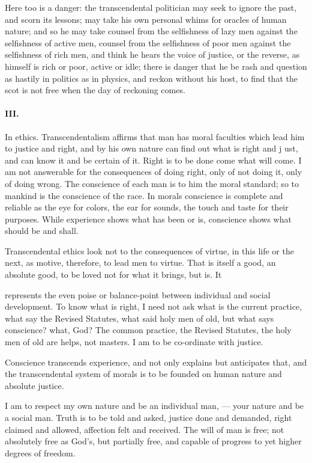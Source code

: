 \documentclass[12pt]{article}
\begin{document}
Here too is a danger: the transcendental politician 
may seek to ignore the past, and scorn its lessons; may 
take his own personal whims for oracles of human nature; and so he may take counsel from the selfishness 
of lazy men against the selfishness of active men, counsel from the selfishness of poor men against the selfishness of rich men, and think he hears the voice of justice, or the reverse, as himself is rich or poor, active or 
idle; there is danger that he be rash and question as 
hastily in politics as in physics, and reckon without his 
host, to find that the scot is not free when the day of 
reckoning comes. 

\paragraph{III.} In ethics. Transcendentalism affirms that man 
has moral faculties which lead him to justice and right, 
and by his own nature can find out what is right and 
j ust, and can know it and be certain of it. Right is to 
be done come what will come. I am not answerable for 
the consequences of doing right, only of not doing it, 
only of doing wrong. The conscience of each man is 
to him the moral standard; so to mankind is the conscience of the race. In morals conscience is complete 
and reliable as the eye for colors, the ear for sounds, 
the touch and taste for their purposes. While experience shows what has been or is, conscience shows what 
should be and shall. 

Transcendental ethics look not to the consequences of 
virtue, in this life or the next, as motive, therefore, to 
lead men to virtue. That is itself a good, an absolute 
good, to be loved not for what it brings, but is. It 




represents the even poise or balance-point between individual and social development. To know what is 
right, I need not ask what is the current practice, what 
say the Revised Statutes, what said holy men of old, 
but what says conscience? what, God? The common 
practice, the Revised Statutes, the holy men of old are 
helps, not masters. I am to be co-ordinate with justice. 

Conscience transcends experience, and not only explains but anticipates that, and the transcendental system of morals is to be founded on human nature and 
absolute justice. 

I am to respect my own nature and be an individual 
man, --- your nature and be a social man. Truth is to 
be told and asked, justice done and demanded, right 
claimed and allowed, affection felt and received. The 
will of man is free; not absolutely free as God's, but 
partially free, and capable of progress to yet higher 
degrees of freedom. 
\end{document}

